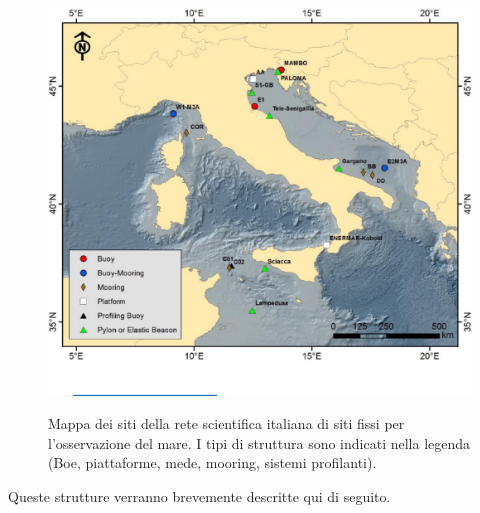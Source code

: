 \documentclass[./main.tex]{subfiles}
\begin{document}
\begin{figure}[!ht]
\noindent\begin{minipage}{0.5\textwidth}
\vspace{1cm}
\includegraphics[width=\textwidth]{images/ifon_rete.pdf}
\captionsetup{font=small, hypcap=false}
\label{fig:rete_ifon}
\end{minipage}
\hspace{0.05\textwidth}
\begin{minipage}{0.4\textwidth}
\begin{small}
Mappa dei siti della rete scientifica italiana di siti fissi per l’osservazione del mare. I tipi di struttura sono indicati nella legenda (Boe, piattaforme, mede, mooring, sistemi profilanti).
\end{small}
\end{minipage}
\vspace{0.25cm}
\end{figure}

Queste strutture verranno brevemente descritte qui di seguito.\par
\end{document}

